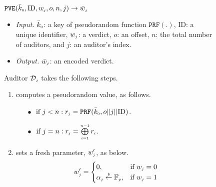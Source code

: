 \begin{figure}[H]
\setlength{\fboxsep}{1pt}
\begin{center}
    \begin{tcolorbox}[enhanced,width=5.5in, height=85mm,
    drop fuzzy shadow southwest,
    colframe=black,colback=white]
\underline{$\mathtt{PVE}(\bar{k}_{\scriptscriptstyle 0}, \text{ID},  w_{\scriptscriptstyle j}, o, n,  j)\rightarrow  \bar{  w}_{\scriptscriptstyle j}$}\\
%
\begin{itemize}
\item \noindent\textit{Input.} $\bar{k}_{\scriptscriptstyle 0}$: a key of  pseudorandom function $\mathtt{PRF}(.)$, $\text{ID}$: a unique identifier, $ w_{\scriptscriptstyle j}$: a  verdict, $o$: an offset, $n$: the total number of  auditors,  and  $j$: an auditor's index.
%
\item \noindent\textit{Output.} $\bar{  w}_{\scriptscriptstyle j}$:  an  encoded verdict.  
%
\end{itemize}
Auditor $\mathcal{D}_{\scriptscriptstyle j}$ takes the following steps.
\begin{enumerate}
%
\item\label{ZSPA:val-gen} computes a  pseudorandom  value,  as follows. 
%
\begin{itemize}
%
\item[$\bullet$]$ \text{ if } j< n: r_{\scriptscriptstyle j}=\mathtt{PRF}(\bar k_{\scriptscriptstyle 0}, o||j||\text{ID})$.\\
%
\item [$\bullet$] $ \text{ if } j=n: r_{\scriptscriptstyle j}= \bigoplus\limits^{\scriptscriptstyle n-1}_{\scriptscriptstyle i=1} r_{\scriptscriptstyle i}$.
%
\end{itemize}
%
\item  sets a fresh parameter, $w'_{\scriptscriptstyle j}$, as below. 
%
\begin{equation*}
   w'_{\scriptscriptstyle j}= 
\begin{cases}
   0,              & \text{if } w_{\scriptscriptstyle j}=0\\
   \alpha_{\scriptscriptstyle j}\stackrel{\scriptscriptstyle\$}\leftarrow \mathbb{F}_{\scriptscriptstyle p} ,& \text{if } w_{\scriptscriptstyle j}=1\\

\end{cases}
\end{equation*}
%


\end{enumerate}
\end{tcolorbox}
\end{center}
\end{figure}
